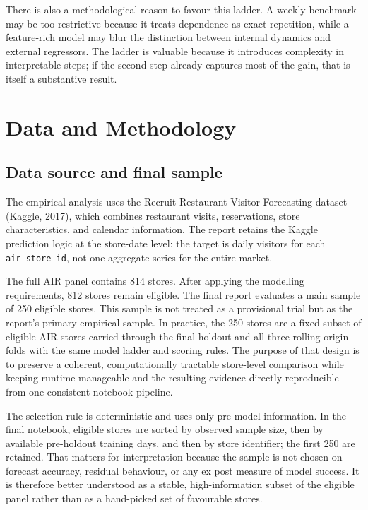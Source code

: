 \documentclass[11pt,oneside]{scrartcl}
\begin{document}
There is also a methodological reason to favour this ladder. A weekly benchmark may be too restrictive because it treats dependence as exact repetition, while a feature-rich model may blur the distinction between internal dynamics and external regressors. The ladder is valuable because it introduces complexity in interpretable steps; if the second step already captures most of the gain, that is itself a substantive result.

\section{Data and Methodology}
\subsection{Data source and final sample}
The empirical analysis uses the Recruit Restaurant Visitor Forecasting dataset (Kaggle, 2017), which combines restaurant visits, reservations, store characteristics, and calendar information. The report retains the Kaggle prediction logic at the store-date level: the target is daily visitors for each \texttt{air\_store\_id}, not one aggregate series for the entire market.

The full AIR panel contains 814 stores. After applying the modelling requirements, 812 stores remain eligible. The final report evaluates a main sample of 250 eligible stores. This sample is not treated as a provisional trial but as the report's primary empirical sample. In practice, the 250 stores are a fixed subset of eligible AIR stores carried through the final holdout and all three rolling-origin folds with the same model ladder and scoring rules. The purpose of that design is to preserve a coherent, computationally tractable store-level comparison while keeping runtime manageable and the resulting evidence directly reproducible from one consistent notebook pipeline.

The selection rule is deterministic and uses only pre-model information. In the final notebook, eligible stores are sorted by observed sample size, then by available pre-holdout training days, and then by store identifier; the first 250 are retained. That matters for interpretation because the sample is not chosen on forecast accuracy, residual behaviour, or any ex post measure of model success. It is therefore better understood as a stable, high-information subset of the eligible panel rather than as a hand-picked set of favourable stores.
\end{document}
